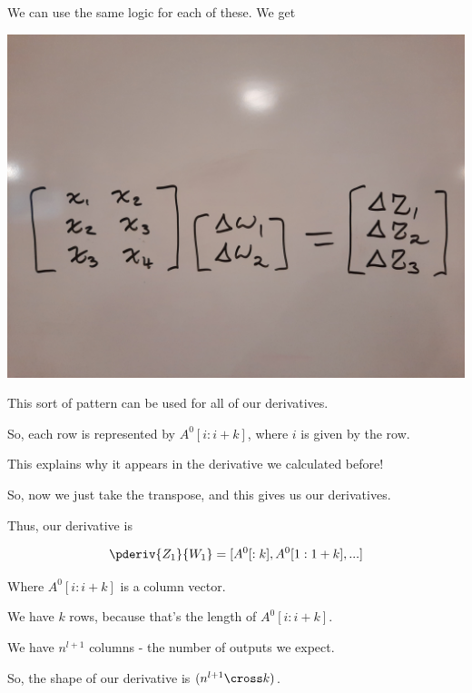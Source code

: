         We can use the same logic for each of these. We get 
        
        \includegraphics[width=\textwidth]{images/convolutional_neural_networks_images/WBConvDeriv.jpg}
        
        This sort of pattern can be used for all of our derivatives.
        
        So, each row is represented by $A^0 [i:i+k]$, where $i$ is given by the row.
        
        This explains why it appears in the derivative we calculated before!
        
        So, now we just take the transpose, and this gives us our derivatives.
        
        Thus, our derivative is 
        
        \begin{equation}
            \pderiv{Z_1}{W_1} = [ A^0[:k], A^0[1:1+k], ...  ]
        \end{equation}
        
        Where $A^0 [i:i+k]$ is a column vector.
        
        We have $k$ rows, because that's the length of $A^0 [i:i+k]$.
        
        We have $n^{l+1}$ columns - the number of outputs we expect.
        
        So, the shape of our derivative is $( n^{l+1} \cross k )$.
        
        
        
        
        
        
        
